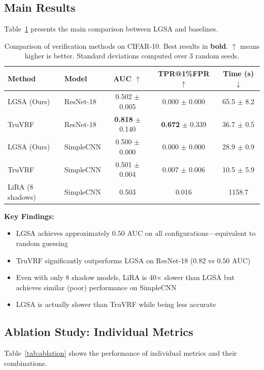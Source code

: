 \documentclass{article}
\begin{document}
\subsection{Main Results}

Table~\ref{tab:main} presents the main comparison between LGSA and baselines.

\begin{table}[t]
\caption{Comparison of verification methods on CIFAR-10. Best results in \textbf{bold}. $\uparrow$ means higher is better. Standard deviations computed over 3 random seeds.}
\label{tab:main}
\centering
\begin{tabular}{llccc}
\toprule
Method & Model & AUC $\uparrow$ & TPR@1\%FPR $\uparrow$ & Time (s) $\downarrow$ \\
\midrule
LGSA (Ours) & ResNet-18 & 0.502 $\pm$ 0.005 & 0.000 $\pm$ 0.000 & 65.5 $\pm$ 8.2 \\
TruVRF & ResNet-18 & \textbf{0.818} $\pm$ 0.140 & \textbf{0.672} $\pm$ 0.339 & 36.7 $\pm$ 0.5 \\
\midrule
LGSA (Ours) & SimpleCNN & 0.500 $\pm$ 0.000 & 0.000 $\pm$ 0.000 & 28.9 $\pm$ 0.9 \\
TruVRF & SimpleCNN & 0.501 $\pm$ 0.004 & 0.007 $\pm$ 0.006 & 10.5 $\pm$ 5.9 \\
LiRA (8 shadows) & SimpleCNN & 0.503 & 0.016 & 1158.7 \\
\bottomrule
\end{tabular}
\end{table}

\textbf{Key Findings:}
\begin{itemize}
    \item LGSA achieves approximately $0.50$ AUC on all configurations---equivalent to random guessing
    \item TruVRF significantly outperforms LGSA on ResNet-18 ($0.82$ vs $0.50$ AUC)
    \item Even with only 8 shadow models, LiRA is 40$\times$ slower than LGSA but achieves similar (poor) performance on SimpleCNN
    \item LGSA is actually slower than TruVRF while being less accurate
\end{itemize}

\subsection{Ablation Study: Individual Metrics}

Table~\ref{tab:ablation} shows the performance of individual metrics and their combinations.
\end{document}
